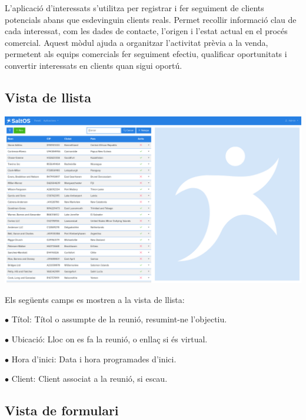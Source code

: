 \documentclass[a4paper]{article}
\begin{document}
L'aplicació d'interessats s'utilitza per registrar i fer seguiment de clients potencials abans que esdevinguin clients reals.
Permet recollir informació clau de cada interessat, com les dades de contacte, l'origen i l'estat actual en el procés comercial.
Aquest mòdul ajuda a organitzar l'activitat prèvia a la venda, permetent als equips comercials fer seguiment efectiu, qualificar oportunitats
i convertir interessats en clients quan sigui oportú.

\hypertarget{toc58}{}
\subsection{Vista de llista}

\begin{center}\includegraphics[width=1\textwidth]{../ujest/snaps/test-screenshots-js-screenshots-crm-leads-list-ca-es-1-snap.png}\end{center}

Els següents camps es mostren a la vista de llista:

\begin{compactitem}
\item[\color{myblue}$\bullet$] Títol: Títol o assumpte de la reunió, resumint-ne l'objectiu.
\item[\color{myblue}$\bullet$] Ubicació: Lloc on es fa la reunió, o enllaç si és virtual.
\item[\color{myblue}$\bullet$] Hora d'inici: Data i hora programades d'inici.
\item[\color{myblue}$\bullet$] Client: Client associat a la reunió, si escau.
\end{compactitem}

\hypertarget{toc59}{}
\subsection{Vista de formulari}
\end{document}

